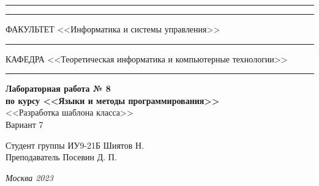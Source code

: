 \documentclass[a4paper, 14pt]{extarticle}
\begin{document}
\begin{titlepage}
\vspace{-25pt}
\hspace{-35pt}\rule{\textwidth}{2.3pt}

\vspace*{-20.3pt}
\hspace{-35pt}\rule{\textwidth}{0.4pt}

\vspace{1.5ex}
\hspace{-35pt} \noindent \small ФАКУЛЬТЕТ\hspace{80pt} <<Информатика и системы управления>>

\vspace*{-16pt}
\hspace{47pt}\rule{0.83\textwidth}{0.4pt}

\vspace{0.5ex}
\hspace{-35pt} \noindent \small КАФЕДРА\hspace{50pt} <<Теоретическая информатика и компьютерные технологии>>

\vspace*{-16pt}
\hspace{30pt}\rule{0.866\textwidth}{0.4pt}
  
\vspace{11em}

\begin{center}
\Large {\bf Лабораторная работа № 8} \\ 
\large {\bf по курсу <<Языки и методы программирования>>} \\
\large <<Разработка шаблона класса>> \\
\Large Вариант 7
\end{center}\normalsize

\vspace{8em}


\begin{flushright}
  {Студент группы ИУ9-21Б Шиятов Н. \hspace*{15pt}\\ 
  \vspace{2ex}
  Преподаватель Посевин Д. П.\hspace*{15pt}}
\end{flushright}

\bigskip

\vfill
 

\begin{center}
\textsl{Москва 2023}
\end{center}
\end{titlepage}
\end{document}
